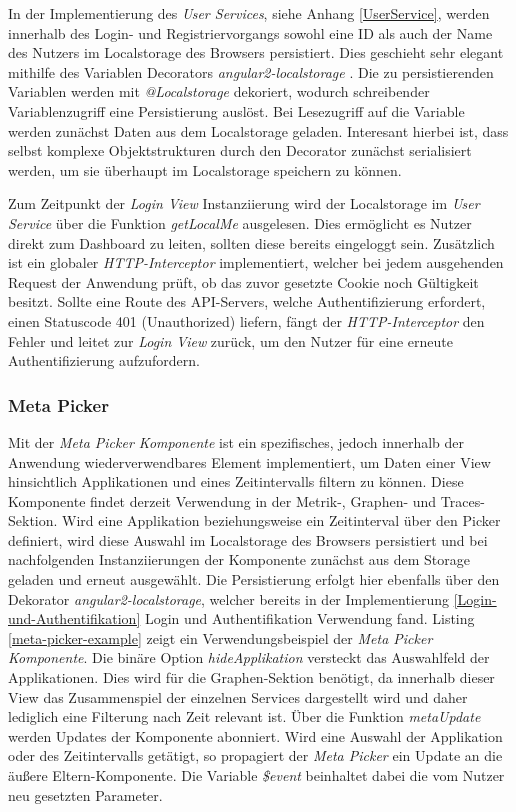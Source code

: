 In der Implementierung des \emph{User Services}, siehe Anhang \ref{UserService}, werden innerhalb des Login- und Registriervorgangs
sowohl eine ID als auch der Name des Nutzers im Localstorage des Browsers persistiert.
Dies geschieht sehr elegant mithilfe des Variablen Decorators \emph{angular2-localstorage} \cite{marcj95:online}.
Die zu persistierenden Variablen werden mit \emph{@Localstorage} dekoriert, wodurch schreibender Variablenzugriff eine Persistierung auslöst.
Bei Lesezugriff auf die Variable werden zunächst Daten aus dem Localstorage geladen.
Interesant hierbei ist, dass selbst komplexe Objektstrukturen durch den Decorator zunächst serialisiert werden, um sie überhaupt im Localstorage speichern zu können.

Zum Zeitpunkt der \emph{Login View} Instanziierung wird der Localstorage im \emph{User Service} über die Funktion \emph{getLocalMe} ausgelesen.
Dies ermöglicht es Nutzer direkt zum Dashboard zu leiten, sollten diese bereits eingeloggt sein.
Zusätzlich ist ein globaler \emph{HTTP-Interceptor} implementiert, welcher bei jedem ausgehenden Request der Anwendung prüft, ob das zuvor gesetzte Cookie noch Gültigkeit besitzt.
Sollte eine Route des \ac{API}-Servers, welche Authentifizierung erfordert, einen Statuscode 401 (Unauthorized) liefern,
fängt der \emph{HTTP-Interceptor} den Fehler und leitet zur \emph{Login View} zurück, um den Nutzer für eine erneute Authentifizierung aufzufordern.




\subsubsection{Meta Picker}

Mit der \emph{Meta Picker Komponente} ist ein spezifisches, jedoch innerhalb der Anwendung wiederverwendbares Element implementiert, um Daten einer View hinsichtlich Applikationen und eines Zeitintervalls filtern zu können.
Diese Komponente findet derzeit Verwendung in der Metrik-, Graphen- und Traces-Sektion. Wird eine Applikation beziehungsweise ein Zeitinterval über den Picker definiert,
wird diese Auswahl im Localstorage des Browsers persistiert und bei nachfolgenden Instanziierungen der Komponente zunächst aus dem Storage geladen und erneut ausgewählt.
Die Persistierung erfolgt hier ebenfalls über den Dekorator \emph{angular2-localstorage},
welcher bereits in der Implementierung \ref{Login-und-Authentifikation} Login und Authentifikation Verwendung fand.
Listing \ref{meta-picker-example} zeigt ein Verwendungsbeispiel der \emph{Meta Picker Komponente}.
Die binäre Option \emph{hideApplikation} versteckt das Auswahlfeld der Applikationen. Dies wird für die Graphen-Sektion benötigt,
da innerhalb dieser View das Zusammenspiel der einzelnen Services dargestellt wird und daher lediglich eine Filterung nach Zeit relevant ist.
Über die Funktion \emph{metaUpdate} werden Updates der Komponente abonniert. Wird eine Auswahl der Applikation oder des Zeitintervalls getätigt,
so propagiert der \emph{Meta Picker} ein Update an die äußere Eltern-Komponente. Die Variable \emph{\$event} beinhaltet dabei die vom Nutzer neu gesetzten Parameter.


